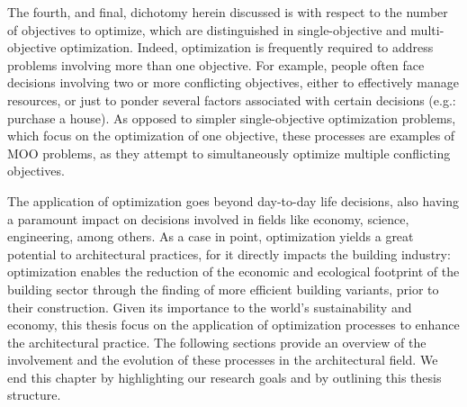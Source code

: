 	The fourth, and final, dichotomy herein discussed is with respect to the number of objectives to optimize, which are distinguished in single-objective and multi-objective optimization. Indeed, optimization is frequently required to address problems involving more than one objective. For example, people often face decisions involving two or more conflicting objectives, either to effectively manage resources, or just to ponder several factors associated with certain decisions (e.g.: purchase a house). As opposed to simpler single-objective optimization problems, which focus on the optimization of one objective, these processes are examples of \ac{MOO} problems, as they attempt to simultaneously optimize multiple conflicting objectives.%
	 
	
	The application of optimization goes beyond day-to-day life decisions, also having a paramount impact on decisions involved in fields like economy, science, engineering, among others. As a case in point, optimization yields a great potential to architectural practices, for it directly impacts the building industry: optimization enables the reduction of the economic and ecological footprint of the building sector through the finding of more efficient building variants, prior to their construction. Given its importance to the world's sustainability and economy, this thesis focus on the application of optimization processes to enhance the architectural practice. The following sections provide an overview of the involvement and the evolution of these processes in the architectural field. We end this chapter by highlighting our research goals and by outlining this thesis structure.

